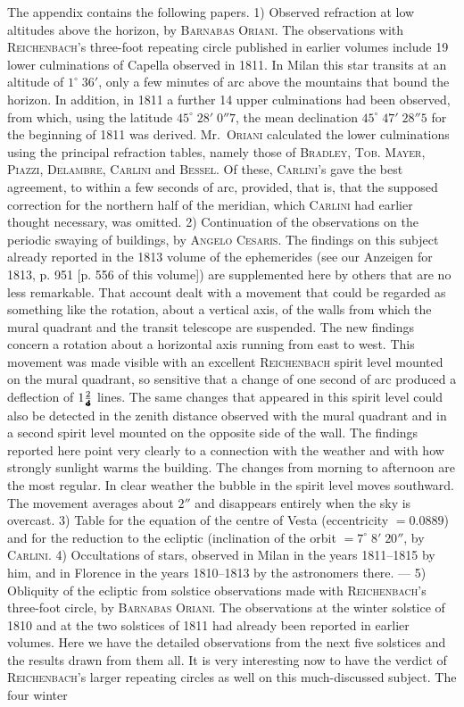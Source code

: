 The appendix contains the following papers. 1) Observed refraction at low altitudes above the horizon, by \textsc{Barnabas Oriani}. The observations with \textsc{Reichenbach}’s three-foot repeating circle published in earlier volumes include 19 lower culminations of Capella observed in 1811. In Milan this star transits at an altitude of $1^\circ\;36'$, only a few minutes of arc above the mountains that bound the horizon. In addition, in 1811 a further 14 upper culminations had been observed, from which, using the latitude $45^\circ\;28'\;0''7$, the mean declination $45^\circ\;47'\;28''5$ for the beginning of 1811 was derived. Mr.\ \textsc{Oriani} calculated the lower culminations using the principal refraction tables, namely those of \textsc{Bradley}, \textsc{Tob. Mayer}, \textsc{Piazzi}, \textsc{Delambre}, \textsc{Carlini} and \textsc{Bessel}. Of these, \textsc{Carlini}’s gave the best agreement, to within a few seconds of arc, provided, that is, that the supposed correction for the northern half of the meridian, which \textsc{Carlini} had earlier thought necessary, was omitted. 2) Continuation of the observations on the periodic swaying of buildings, by \textsc{Angelo Cesaris}. The findings on this subject already reported in the 1813 volume of the ephemerides (see our Anzeigen for 1813, p. 951 [p. 556 of this volume]) are supplemented here by others that are no less remarkable. That account dealt with a movement that could be regarded as something like the rotation, about a vertical axis, of the walls from which the mural quadrant and the transit telescope are suspended. The new findings concern a rotation about a horizontal axis running from east to west. This movement was made visible with an excellent \textsc{Reichenbach} spirit level mounted on the mural quadrant, so sensitive that a change of one second of arc produced a deflection of $1\frac{2}{\ObservedLibelleDenominator}$ lines. The same changes that appeared in this spirit level could also be detected in the zenith distance observed with the mural quadrant and in a second spirit level mounted on the opposite side of the wall. The findings reported here point very clearly to a connection with the weather and with how strongly sunlight warms the building. The changes from morning to afternoon are the most regular. In clear weather the bubble in the spirit level moves southward. The movement averages about $2''$ and disappears entirely when the sky is overcast. 3) Table for the equation of the centre of Vesta (eccentricity $=0.0889$) and for the reduction to the ecliptic (inclination of the orbit $=7^\circ\;8'\;20''$, by \textsc{Carlini}. 4) Occultations of stars, observed in Milan in the years 1811--1815 by him, and in Florence in the years 1810--1813 by the astronomers there. --- 5) Obliquity of the ecliptic from solstice observations made with \textsc{Reichenbach}’s three-foot circle, by \textsc{Barnabas Oriani}. The observations at the winter solstice of 1810 and at the two solstices of 1811 had already been reported in earlier volumes. Here we have the detailed observations from the next five solstices and the results drawn from them all. It is very interesting now to have the verdict of \textsc{Reichenbach}’s larger repeating circles as well on this much-discussed subject. The four winter 
